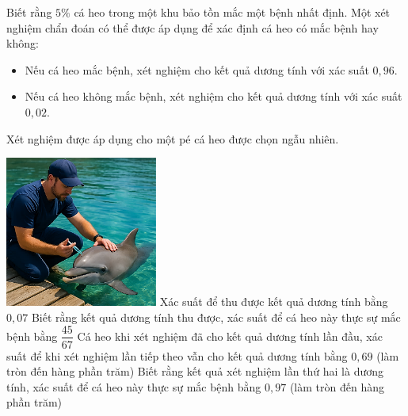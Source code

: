 \begin{ex}%
\immini
{
    Biết rằng $5\%$ cá heo trong một khu bảo tồn mắc một bệnh nhất định. Một xét nghiệm chẩn đoán có thể được áp dụng để xác định cá heo có mắc bệnh hay không:
\begin{itemize}
    \item Nếu cá heo mắc bệnh, xét nghiệm cho kết quả dương tính với xác suất $0{,}96$.
    \item Nếu cá heo không mắc bệnh, xét nghiệm cho kết quả dương tính với xác suất $0{,}02$.
\end{itemize}
Xét nghiệm được áp dụng cho một pé cá heo được chọn ngẫu nhiên.
}
{
    \includegraphics[width=5cm]{img/HXN-9-16}
}
    \choiceTF
    {Xác suất để thu được kết quả dương tính bằng $0{,}07$}
    {Biết rằng kết quả dương tính thu được, xác suất để cá heo này thực sự mắc bệnh bằng $\dfrac{45}{67}$}
    {\True Cá heo khi xét nghiệm đã cho kết quả dương tính lần đầu, xác suất để khi xét nghiệm lần tiếp theo vẫn cho kết quả dương tính bằng $ 0{,}69$ (làm tròn đến hàng phần trăm)}
    {Biết rằng kết quả xét nghiệm lần thứ hai là dương tính, xác suất để cá heo này thực sự mắc bệnh bằng $0{,}97$ (làm tròn đến hàng phần trăm)}
\end{ex}

